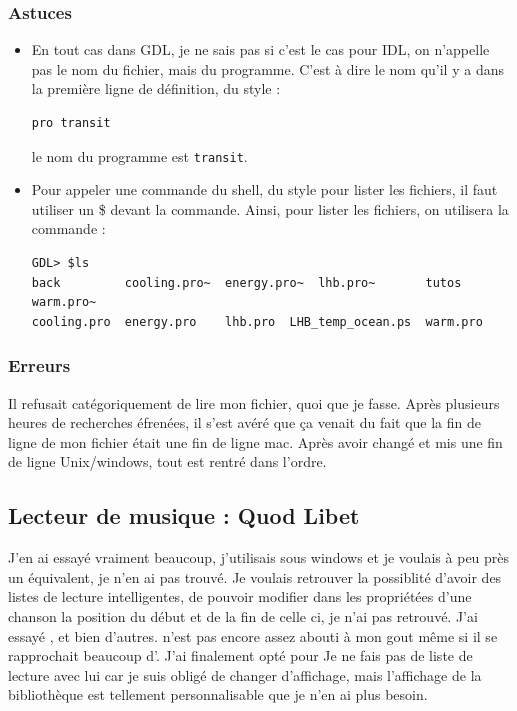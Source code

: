 \documentclass[a4paper,twoside]{article}
\begin{document}
\subsubsection{Astuces}
\begin{itemize}
\item En tout cas dans GDL, je ne sais pas si c'est le cas pour IDL, on n'appelle pas le nom du fichier, mais du programme. C'est à dire le nom qu'il y a dans la première ligne de définition, du style :
\begin{verbatim}
pro transit
\end{verbatim}
le nom du programme est \verb|transit|.
\item Pour appeler une commande du shell, du style pour lister les fichiers, il faut utiliser un \$ devant la commande. Ainsi, pour lister les fichiers, on utilisera la commande :
\begin{verbatim}
GDL> $ls
back	     cooling.pro~  energy.pro~	lhb.pro~	   tutos     warm.pro~
cooling.pro  energy.pro    lhb.pro	LHB_temp_ocean.ps  warm.pro
\end{verbatim}
\end{itemize}

\subsubsection{Erreurs}
Il refusait catégoriquement de lire mon fichier, quoi que je fasse. Après plusieurs heures de recherches éfrenées, il s'est avéré que ça venait du fait que la fin de ligne de mon fichier était une fin de ligne mac. Après avoir changé et mis une fin de ligne Unix/windows, tout est rentré dans l'ordre.





\subsection{Lecteur de musique : Quod Libet}
J'en ai essayé vraiment beaucoup, j'utilisais  sous windows et je voulais à peu près un équivalent, je n'en ai pas trouvé. Je voulais retrouver la possiblité d'avoir des listes de lecture intelligentes, de pouvoir modifier dans les propriétées d'une chanson la position du début et de la fin de celle ci, je n'ai pas retrouvé. J'ai essayé ,  et bien d'autres.  n'est pas encore assez abouti à mon gout même si il se rapprochait beaucoup d'. J'ai finalement opté pour  Je ne fais pas de liste de lecture avec lui car je suis obligé de changer d'affichage, mais l'affichage de la bibliothèque est tellement personnalisable que je n'en ai plus besoin.
\end{document}
